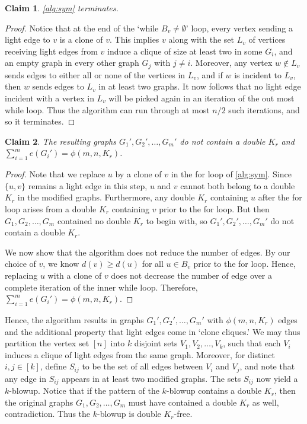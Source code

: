 \documentclass[12pt]{article}
\newtheorem{claim}{Claim}
\begin{document}
\begin{claim}
  \cref{alg:sym} terminates.
\end{claim}

\begin{proof}
  Notice that at the end of the `while $B_v \neq \emptyset$' loop, every vertex sending a light edge to $v$ is a clone of $v$. This implies $v$ along with the set $L_v$ of vertices receiving light edges from $v$ induce a clique of size at least two in some $G_i$, and an empty graph in every other graph $G_j$ with $j \neq i$. Moreover, any vertex $w \notin L_v$ sends edges to either all or none of the vertices in $L_v$, and if $w$ is incident to $L_v$, then $w$ sends edges to $L_v$ in at least two graphs. It now follows that no light edge incident with a vertex in $L_v$ will be picked again in an iteration of the out most while loop. Thus the algorithm can run through at most $n/2$ such iterations, and so it terminates.
\end{proof}

\begin{claim}
  The resulting graphs $G_1', G_2', \ldots, G_m'$ do not contain a double $K_r$ and $\sum_{i = 1}^m e(G_i') = \phi(m, n, K_r)$. 
\end{claim}

\begin{proof}
  Note that we replace $u$ by a clone of $v$ in the for loop of \cref{alg:sym}. Since $\{u, v\}$ remains a light edge in this step, $u$ and $v$ cannot both belong to a double $K_r$ in the modified graphs. Furthermore, any double $K_r$ containing $u$ after the for loop arises from a double $K_r$ containing $v$ prior to the for loop. But then $G_1, G_2, \ldots, G_m$ contained no double $K_r$ to begin with, so $G_1', G_2', \ldots, G_m'$ do not contain a double $K_r$.

  We now show that the algorithm does not reduce the number of edges. By our choice of $v$, we know $d(v) \geq d(u)$ for all $u \in B_v$ prior to the for loop. Hence, replacing $u$ with a clone of $v$ does not decrease the number of edge over a complete iteration of the inner while loop. Therefore, $\sum_{i = 1}^m e(G_i') = \phi(m, n, K_r)$. 
\end{proof}

Hence, the algorithm results in graphs $G_1', G_2', \ldots, G_m'$ with $\phi(m, n, K_r)$ edges and the additional property that light edges come in `clone cliques.' We may thus partition the vertex set $[n]$ into $k$ disjoint sets $V_1, V_2, \ldots, V_k$, such that each $V_i$ induces a clique of light edges from the same graph. Moreover, for distinct $i, j \in [k]$, define $S_{ij}$ to be the set of all edges between $V_i$ and $V_j$, and note that any edge in $S_{ij}$ appears in at least two modified graphs. The sets $S_{ij}$ now yield a $k$-blowup. Notice that if the pattern of the $k$-blowup contains a double $K_r$, then the original graphs $G_1, G_2, \ldots, G_m$ must have contained a double $K_r$ as well, contradiction. Thus the $k$-blowup is double $K_r$-free. 
\end{document}
